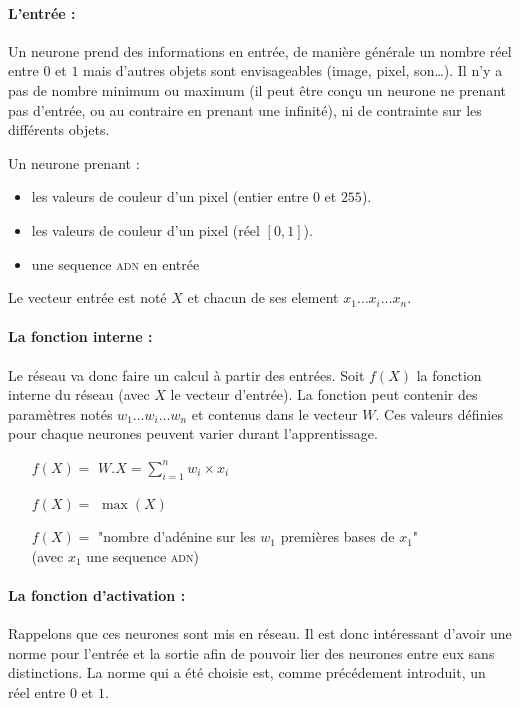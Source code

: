 \paragraph{L'entrée :}
Un neurone prend des informations en entrée, de manière générale un nombre réel entre $0$ et $1$
mais d'autres objets sont envisageables (image, pixel, son\ldots).
Il n'y a pas de nombre minimum ou maximum
(il peut être conçu un neurone ne prenant pas d'entrée, ou au contraire en prenant une infinité),
ni de contrainte sur les différents objets.
\exemle
{
Un neurone prenant :
\begin{itemize}
    \item les valeurs de couleur d'un pixel (entier entre $0$ et $255$).
    \item les valeurs de couleur d'un pixel (réel $[0, 1]$).
    \item une sequence \textsc{adn} en entrée

\end{itemize}
}
Le vecteur entrée est noté $X$ et chacun de ses element $x_1 \ldots x_i \ldots x_n$.

\paragraph{La fonction interne :}
Le réseau va donc faire un calcul à partir des entrées.
Soit $f(X)$ la fonction interne du réseau (avec $X$ le vecteur d'entrée).
La fonction peut contenir des paramètres notés $w_1 \ldots w_i \ldots w_n$ et contenus dans le vecteur $W$.
Ces valeurs définies pour chaque neurones peuvent varier durant l'apprentissage.

\exemle
{
\begin{itemize}
    \item[$f(X) =$] $W.X = \sum_{i=1}^{n} w_i \times x_i $
    \item[$f(X) =$] $\max(X)$
    \item[$f(X) =$] "nombre d'adénine sur les $w_1$ premières bases de $x_1$" \\
            (avec $x_1$ une sequence \textsc{adn})
\end{itemize}
}


\paragraph{La fonction d'activation :}
Rappelons que ces neurones sont mis en réseau.
Il est donc intéressant d'avoir une norme pour l'entrée et la sortie
afin de pouvoir lier des neurones entre eux sans distinctions.
La norme qui a été choisie est, comme précédement introduit, un réel entre $0$ et $1$.


